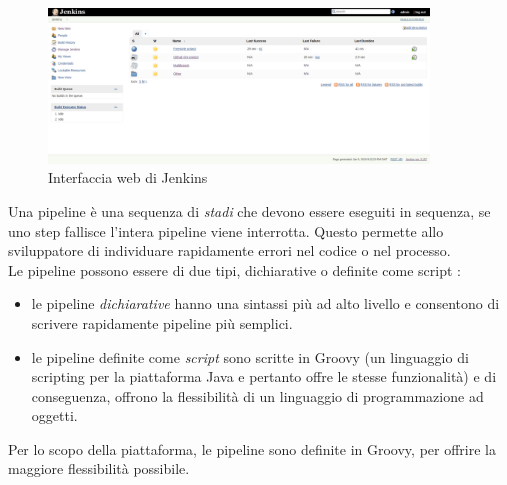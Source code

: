 \documentclass[a4paper, 12pt]{report}
\numberwithin{equation}{section}
\begin{document}
\begin{figure}[H]
    \centering
    \includegraphics[width=0.9\textwidth]{imgs/jenkins-gui.png}
    \caption{Interfaccia web di Jenkins}
    \label{fig:jenkins-gui}
\end{figure}
Una pipeline è una sequenza di \emph{stadi} che devono essere eseguiti in sequenza, se uno step fallisce l’intera pipeline viene interrotta. Questo permette allo sviluppatore di individuare rapidamente errori nel codice o nel processo.\\
Le pipeline possono essere di due tipi, dichiarative o definite come script \cite{jenkins-docs}:
\begin{itemize}
    \item le pipeline \emph{dichiarative} hanno una sintassi più ad alto livello e consentono di scrivere rapidamente pipeline più semplici.
    \item le pipeline definite come \emph{script} sono scritte in Groovy (un linguaggio di scripting per la piattaforma Java e pertanto offre le stesse funzionalità) e di conseguenza, offrono la flessibilità di un linguaggio di programmazione ad oggetti.
\end{itemize}
Per lo scopo della piattaforma, le pipeline sono definite in Groovy, per offrire la maggiore flessibilità possibile.
\end{document}
